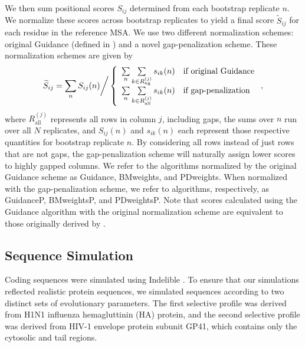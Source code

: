 \documentclass[11pt]{article}
\begin{document}
We then sum positional scores $S_{ij}$ determined from each bootstrap replicate $n$. We normalize these scores across bootstrap replicates to yield a final score $\widetilde{S}_{ij}$ for each residue in the reference MSA. We use two different normalization schemes: original Guidance (defined in \citet{Penn2010}) and a novel gap-penalization scheme. These normalization schemes are given by \begin{equation}
\widetilde{S}_{ij}  = \sum_n S_{ij}(n) \bigg{/} \left\{ \begin{array}{rl}

              \sum\limits_n \sum\limits_{k \in R_\text{ng}^{(j)}} s_{ik}(n)     &\mbox{if original Guidance} \\
              \sum\limits_n \sum\limits_{k \in R_\text{all}^{(j)}} s_{ik}(n)     &\mbox{if gap-penalization} \\      
        \end{array} \right.,
\end{equation} 
where $R_\text{all}^{(j)}$ represents all rows in column $j$, including gaps, the sums over $n$ run over all $N$ replicates, and $S_{ij}(n)$ and $s_{ik}(n)$ each represent those respective quantities for bootstrap replicate $n$. By considering all rows instead of just rows that are not gaps, the gap-penalization scheme will naturally assign lower scores to highly gapped columns. We refer to the algorithms normalized by the original Guidance scheme as Guidance, BMweights, and PDweights. When normalized with the gap-penalization scheme, we refer to algorithms, respectively, as GuidanceP, BMweightsP, and PDweightsP. Note that scores calculated using the Guidance algorithm with the original normalization scheme are equivalent to those originally derived by \citet{Penn2010}. 



\subsection*{Sequence Simulation}
Coding sequences were simulated using Indelible \citep{Fletcher2009}. To ensure that our simulations reflected realistic protein sequences, we simulated sequences according to two distinct sets of evolutionary parameters. The first selective profile was derived from H1N1 influenza hemagluttinin (HA) protein, and the second selective profile was derived from HIV-1 envelope protein subunit GP41, which contains only the cytosolic and tail regions. 
\end{document}
